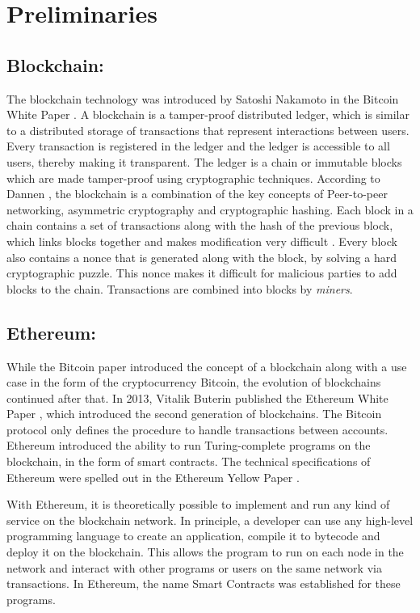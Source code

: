 \documentclass[10pt,conference]{IEEEtran}
\begin{document}
	
	\section{Preliminaries}
	\label{sec:prelims}
	
	\subsection{Blockchain:}
	The blockchain technology was introduced by Satoshi Nakamoto in the Bitcoin White Paper \cite{bitcoinpaper}. A blockchain is a tamper-proof distributed ledger, which is similar to a distributed storage of transactions \cite{bitcoinbook} that represent interactions between users. Every transaction is registered in the ledger and the ledger is accessible to all users, thereby making it transparent. The ledger is a chain or immutable blocks which are made tamper-proof using cryptographic techniques. According to Dannen \cite{bitcoinbook}, the blockchain is a combination of the key concepts of Peer-to-peer networking, asymmetric cryptography and cryptographic hashing. Each block in a chain contains a set of transactions along with the hash of the previous block, which links blocks together and makes modification very difficult \cite{bitcoinpaper}. Every block also contains a nonce that is generated along with the block, by solving a hard cryptographic puzzle. This nonce makes it difficult for malicious parties to add blocks to the chain. Transactions are combined into blocks by \textit{miners}.
	
	\subsection{Ethereum:}
	
	While the Bitcoin paper introduced the concept of a blockchain along with a use case in the form of the cryptocurrency Bitcoin, the evolution of blockchains continued after that. In 2013, Vitalik Buterin published the Ethereum White Paper \cite{ethpaper}, which introduced the second generation of blockchains. The Bitcoin protocol only defines the procedure to handle transactions between accounts. Ethereum introduced the ability to run Turing-complete programs on the blockchain, in the form of smart contracts. The technical specifications of Ethereum were spelled out in the Ethereum Yellow Paper \cite{wood2019ethereum}.
	
	With Ethereum, it is theoretically possible to implement and run any kind of service on the blockchain network. In principle, a developer can use any high-level programming language to create an application, compile it to bytecode and deploy it on the blockchain. This allows the program to run on each node in the network and interact with other programs or users on the same network via transactions. In Ethereum, the name Smart Contracts was established for these programs.
	
\end{document}
